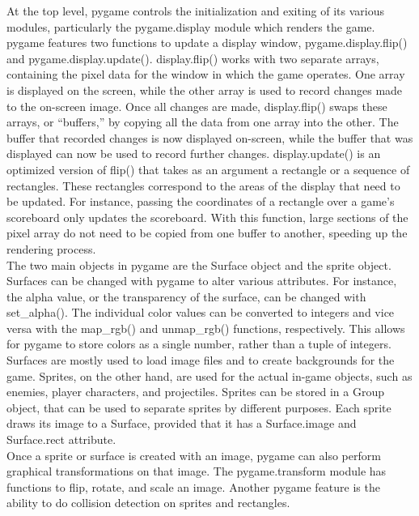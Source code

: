 At the top level, pygame controls the initialization and exiting of its various modules, particularly the pygame.display module which renders the game. pygame features two functions to update a display window, pygame.display.flip() and pygame.display.update(). display.flip() works with two separate arrays, containing the pixel data for the window in which the game operates. One array is displayed on the screen, while the other array is used to record changes made to the on-screen image. Once all changes are made, display.flip() swaps these arrays, or ``buffers,'' by copying all the data from one array into the other. The buffer that recorded changes is now displayed on-screen, while the buffer that was displayed can now be used to record further changes. display.update() is an optimized version of flip() that takes as an argument a rectangle or a sequence of rectangles. These rectangles correspond to the areas of the display that need to be updated. For instance, passing the coordinates of a rectangle over a game's scoreboard only updates the scoreboard. With this function, large sections of the pixel array do not need to be copied from one buffer to another, speeding up the rendering process.\\

The two main objects in pygame are the Surface object and the sprite object. Surfaces can be changed with pygame to alter various attributes. For instance, the alpha value, or the transparency of the surface, can be changed with set\_alpha(). The individual color values can be converted to integers and vice versa with the map\_rgb() and unmap\_rgb() functions, respectively. This allows for pygame to store colors as a single number, rather than a tuple of integers. Surfaces are mostly used to load image files and to create backgrounds for the game. Sprites, on the other hand, are used for the actual in-game objects, such as enemies, player characters, and projectiles. Sprites can be stored in a Group object, that can be used to separate sprites by different purposes. Each sprite draws its image to a Surface, provided that it has a Surface.image and Surface.rect attribute.\\

Once a sprite or surface is created with an image, pygame can also perform graphical transformations on that image. The pygame.transform module has functions to flip, rotate, and scale an image. Another pygame feature is the ability to do collision detection on sprites and rectangles.\\

